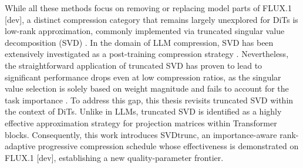  While all these methods focus on removing or replacing model parts of FLUX.1 [dev], a distinct compression category that remains largely unexplored for \gls{DiT}s is low-rank approximation, commonly implemented via truncated singular value decomposition (\gls{SVD}) 
 \cite{zhang2015singular}. In the domain of \gls{LLM} compression, \gls{SVD} has been extensively investigated as a post-training compression strategy \cite{DLowRankEst,SVD_LLM_V2}. Nevertheless, the straightforward application of truncated \gls{SVD} has proven to lead to significant performance drops \cite{hsu2022language,wang2025dobi,SVD_LLM_V2,wang2024svd} even at low compression ratios, as the singular value selection is solely based on weight magnitude and fails to account for the task importance \cite{GRASP}. 
To address this gap, this thesis revisits truncated \gls{SVD} within the context of \gls{DiT}s. Unlike in \gls{LLM}s, truncated \gls{SVD} is identified as a highly effective approximation strategy for projection matrices within Transformer blocks. Consequently, this work introduces \gls{SVD}trunc, an importance-aware rank-adaptive progressive compression schedule whose effectiveness is demonstrated on FLUX.1 [dev], establishing a new quality-parameter frontier. 


 

 